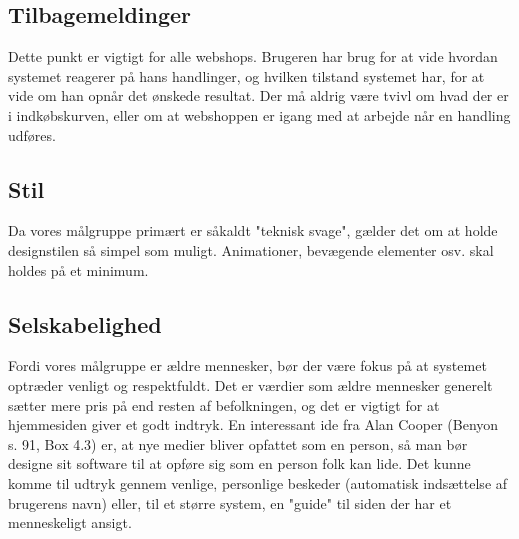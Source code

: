 \subsection{Tilbagemeldinger}
Dette punkt er vigtigt for alle webshops. Brugeren har brug for at vide hvordan systemet reagerer på hans
handlinger, og hvilken tilstand systemet har, for at vide om han opnår det ønskede resultat. Der må aldrig
være tvivl om hvad der er i indkøbskurven, eller om at webshoppen er igang med at arbejde når en handling
udføres.

\subsection{Stil}
Da vores målgruppe primært er såkaldt "teknisk svage", gælder det om at holde designstilen så simpel
som muligt. Animationer, bevægende elementer osv. skal holdes på et minimum.

\subsection{Selskabelighed}
Fordi vores målgruppe er ældre mennesker, bør der være fokus på at systemet optræder venligt og respektfuldt.
Det er værdier som ældre mennesker generelt sætter mere pris på end resten af befolkningen, og det er vigtigt
for at hjemmesiden giver et godt indtryk.
En interessant ide fra Alan Cooper (Benyon s. 91, Box 4.3) er, at nye medier bliver opfattet som en
person, så man bør designe sit software til at opføre sig som en person folk kan lide. Det kunne komme til udtryk
gennem venlige, personlige beskeder (automatisk indsættelse af brugerens navn) eller, til et større system, en "guide"
til siden der har et menneskeligt ansigt. 



